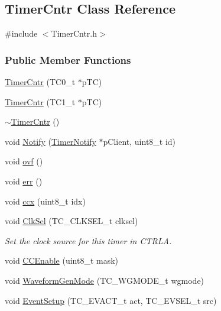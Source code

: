 \hypertarget{class_timer_cntr}{
\subsection{TimerCntr Class Reference}
\label{class_timer_cntr}
}


{\ttfamily \#include $<$TimerCntr.h$>$}

\subsubsection*{Public Member Functions}
\begin{DoxyCompactItemize}
\item 
\hyperlink{class_timer_cntr_ad03f5cb857585c26d62eee0667a3c37c}{TimerCntr} (TC0\_\-t $\ast$pTC)
\item 
\hyperlink{class_timer_cntr_a250ce8e521da601255ec0b631370a47c}{TimerCntr} (TC1\_\-t $\ast$pTC)
\item 
\hyperlink{class_timer_cntr_a5b19cb68e0fc19361854553031161544}{$\sim$TimerCntr} ()
\item 
void \hyperlink{class_timer_cntr_a71bf73ee43e8d344d1241695b553556b}{Notify} (\hyperlink{class_timer_notify}{TimerNotify} $\ast$pClient, uint8\_\-t id)
\item 
void \hyperlink{class_timer_cntr_ac2a4b19dfdb9f873075f405f242df698}{ovf} ()
\item 
void \hyperlink{class_timer_cntr_a98d639cbcb4ed28a75309870ae891d58}{err} ()
\item 
void \hyperlink{class_timer_cntr_a1966661facfcb11382471a214191d3f0}{ccx} (uint8\_\-t idx)
\item 
void \hyperlink{class_timer_cntr_a6e5c896a3f85311e011ee552534f1032}{ClkSel} (TC\_\-CLKSEL\_\-t clksel)
\begin{DoxyCompactList}\small\item\em Set the clock source for this timer in CTRLA. \item\end{DoxyCompactList}\item 
void \hyperlink{class_timer_cntr_a7c3e5ae54af9a3431050d623d508cd2c}{CCEnable} (uint8\_\-t mask)
\item 
void \hyperlink{class_timer_cntr_ab5df59d94a8d1706f9282a695e43a9a1}{WaveformGenMode} (TC\_\-WGMODE\_\-t wgmode)
\item 
void \hyperlink{class_timer_cntr_a27f54d05be459f37793e98743325a614}{EventSetup} (TC\_\-EVACT\_\-t act, TC\_\-EVSEL\_\-t src)
\item 

\end{DoxyCompactItemize}
